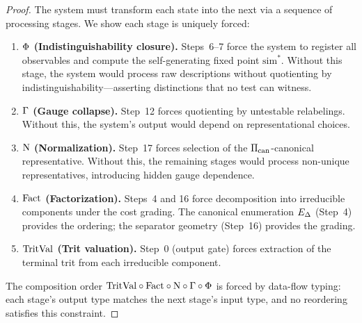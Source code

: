 \begin{proof}
The system must transform each state into the next via a sequence of
processing stages.  We show each stage is uniquely forced:

\begin{enumerate}[nosep]
  \item \textbf{$\Phi$ (Indistinguishability closure).}
        Steps~6--7 force the system to register all observables and compute
        the self-generating fixed point $\mathrm{sim}^*$.  Without this stage,
        the system would process raw descriptions without quotienting by
        indistinguishability---asserting distinctions that no test can witness.

  \item \textbf{$\Gamma$ (Gauge collapse).}
        Step~12 forces quotienting by untestable relabelings.  Without this,
        the system's output would depend on representational choices.

  \item \textbf{$\mathrm{N}$ (Normalization).}
        Step~17 forces selection of the $\Pi_{\mathrm{can}}$-canonical representative.
        Without this, the remaining stages would process non-unique
        representatives, introducing hidden gauge dependence.

  \item \textbf{$\mathrm{Fact}$ (Factorization).}
        Steps~4 and 16 force decomposition into irreducible components under
        the cost grading.  The canonical enumeration $E_\Delta$ (Step~4)
        provides the ordering; the separator geometry (Step~16) provides the
        grading.

  \item \textbf{$\mathrm{TritVal}$ (Trit valuation).}
        Step~0 (output gate) forces extraction of the terminal trit
        from each irreducible component.
\end{enumerate}

The composition order $\mathrm{TritVal} \circ \mathrm{Fact} \circ \mathrm{N} \circ
\Gamma \circ \Phi$ is forced by data-flow typing: each stage's
output type matches the next stage's input type, and no reordering
satisfies this constraint.

\end{proof}


